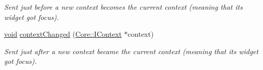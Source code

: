\begin{DoxyCompactItemize}
\begin{DoxyCompactList}\small\item\em Sent just before a new {\itshape context} becomes the current context (meaning that its widget got focus). \end{DoxyCompactList}\item 
\hyperlink{group___u_a_v_objects_plugin_ga444cf2ff3f0ecbe028adce838d373f5c}{void} \hyperlink{group___core_plugin_ga61aa6225c352ac731243c640d281c56e}{context\-Changed} (\hyperlink{class_core_1_1_i_context}{Core\-::\-I\-Context} $\ast$context)
\begin{DoxyCompactList}\small\item\em Sent just after a new {\itshape context} became the current context (meaning that its widget got focus). \end{DoxyCompactList}\end{DoxyCompactItemize}
